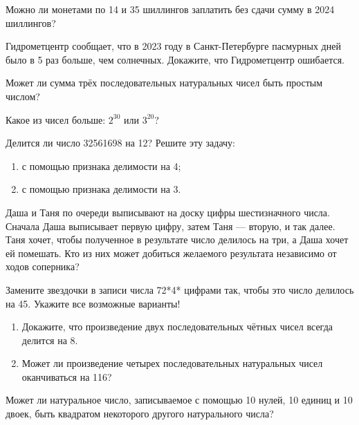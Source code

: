 \documentclass{article}
\begin{document}
\begin{enumerate_boxed}
        \item Можно ли монетами по 14 и 35 шиллингов заплатить без сдачи сумму в 2024 шиллингов?

        \item Гидрометцентр сообщает, что в 2023 году в Санкт-Петербурге пасмурных дней было в 5 раз больше, чем солнечных.
        Докажите, что Гидрометцентр ошибается.

        \item Может ли сумма трёх последовательных натуральных чисел быть простым числом?

        \item Какое из чисел больше: $2^{30}$ или $3^{20}$?

        \item Делится ли число 32561698 на 12?
        Решите эту задачу:
        \begin{enumerate}
            \item с помощью признака делимости на 4;
            \item с помощью признака делимости на 3.
        \end{enumerate}

        \item Даша и Таня по очереди выписывают на доску цифры шестизначного числа.
        Сначала Даша выписывает первую цифру, затем Таня — вторую, и так далее.
        Таня хочет, чтобы полученное в результате число делилось на три, а Даша хочет ей помешать.
        Кто из них может добиться желаемого результата независимо от ходов соперника?

        \item Замените звездочки в записи числа 72*4* цифрами так, чтобы это число делилось на 45.
        Укажите все возможные варианты!

        \item
        \begin{enumerate}
            \item Докажите, что произведение двух последовательных чётных чисел всегда делится на 8.

            \item Может ли произведение четырех последовательных натуральных чисел оканчиваться на 116?

        \end{enumerate}


        \item Может ли натуральное число, записываемое с помощью 10 нулей, 10 единиц и 10 двоек, быть квадратом некоторого другого натурального числа?


\end{enumerate_boxed}
\end{document}
